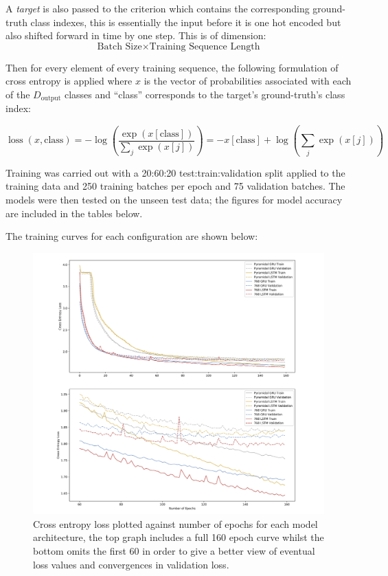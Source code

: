 \documentclass[12pt,]{article}
\begin{document}
A \emph{target} is also passed to the criterion which contains the
corresponding ground-truth class indexes, this is essentially the input
before it is one hot encoded but also shifted forward in time by one
step. This is of dimension:
\[\text{Batch Size} \times \text{Training Sequence Length}\]

Then for every element of every training sequence, the following
formulation of cross entropy is applied where \(x\) is the vector of
probabilities associated with each of the \(D_{\text{output}}\) classes
and ``class'' corresponds to the target's ground-truth's class index:

\[
\operatorname{loss}(x, \text {class})=-\log \left(\frac{\exp (x[\text{class}])}{\sum_{j} \exp (x[j])}\right)=-x[\text {class}]+\log \left(\sum_{j} \exp (x[j])\right)
\]

Training was carried out with a 20:60:20 test:train:validation split
applied to the training data and 250 training batches per epoch and 75
validation batches. The models were then tested on the unseen test data;
the figures for model accuracy are included in the tables below.

The training curves for each configuration are shown below:

\begin{figure}
\centering
\includegraphics{Images/loss.png}
\caption{Cross entropy loss plotted against number of epochs for each
model architecture, the top graph includes a full 160 epoch curve whilst
the bottom omits the first 60 in order to give a better view of eventual
loss values and convergences in validation loss.}
\end{figure}
\end{document}
